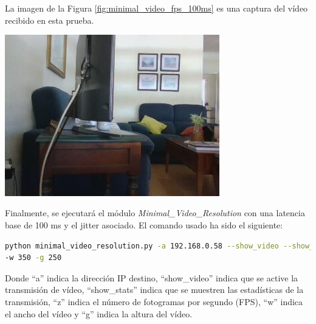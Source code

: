 \newpage
La imagen de la Figura \ref{fig:minimal_video_fps_100ms} es una captura del vídeo recibido en esta prueba.
\begin{center}
  \includegraphics[width = 0.7\textwidth]{images/VideoRecibido5.2.png}
  \label{fig:minimal_video_fps_100ms}
\end{center}

\newpage

Finalmente, se ejecutará el módulo \textit{Minimal\_Video\_Resolution} con una latencia base de 100 ms y el jitter asociado. El comando usado ha sido el siguiente:

\begin{lstlisting}[language=bash,basicstyle=\ttfamily\scriptsize]
python minimal_video_resolution.py -a 192.168.0.58 --show_video --show_stats -z 12 \\
-w 350 -g 250
\end{lstlisting}
Donde ``a'' indica la dirección IP destino, ``show\_video'' indica que se active la transmisión de vídeo, ``show\_stats'' indica que se muestren las estadísticas de la transmisión, ``z'' indica el número de fotogramas por segundo (FPS), ``w'' indica el ancho del vídeo y ``g'' indica la altura del vídeo.
\vspace{\baselineskip}

